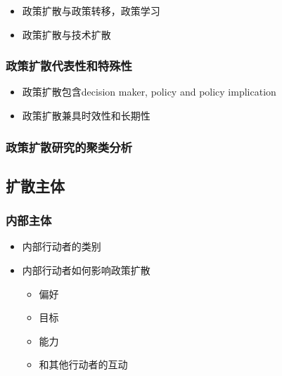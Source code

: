 \documentclass[
  12pt,
]{ctexart}
\providecommand{\tightlist}{%
  \setlength{\itemsep}{0pt}\setlength{\parskip}{0pt}}
\begin{document}
\begin{itemize}
\item
  政策扩散与政策转移，政策学习
\item
  政策扩散与技术扩散
\end{itemize}

\hypertarget{ux653fux7b56ux6269ux6563ux4ee3ux8868ux6027ux548cux7279ux6b8aux6027}{%
\subsubsection{政策扩散代表性和特殊性}\label{ux653fux7b56ux6269ux6563ux4ee3ux8868ux6027ux548cux7279ux6b8aux6027}}

\begin{itemize}
\tightlist
\item
  政策扩散包含decision maker, policy and policy implication
\item
  政策扩散兼具时效性和长期性
\end{itemize}

\hypertarget{ux653fux7b56ux6269ux6563ux7814ux7a76ux7684ux805aux7c7bux5206ux6790}{%
\subsubsection{政策扩散研究的聚类分析}\label{ux653fux7b56ux6269ux6563ux7814ux7a76ux7684ux805aux7c7bux5206ux6790}}

\hypertarget{ux6269ux6563ux4e3bux4f53}{%
\subsection{扩散主体}\label{ux6269ux6563ux4e3bux4f53}}

\hypertarget{ux5185ux90e8ux4e3bux4f53}{%
\subsubsection{内部主体}\label{ux5185ux90e8ux4e3bux4f53}}

\begin{itemize}
\item
  内部行动者的类别
\item
  内部行动者如何影响政策扩散

  \begin{itemize}
  \item
    偏好
  \item
    目标
  \item
    能力
  \item
    和其他行动者的互动
  \end{itemize}
\end{itemize}
\end{document}
